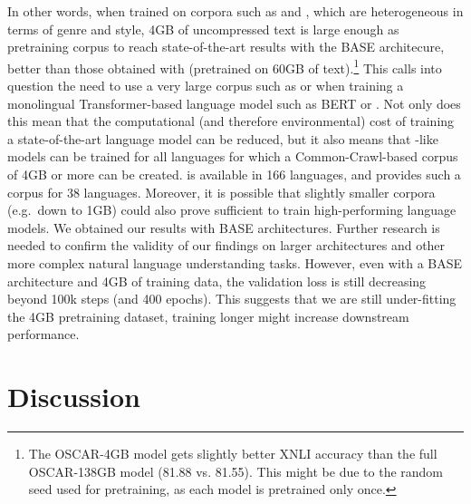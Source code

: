In other words, when trained on corpora such as \oscar and \ccnet, which are heterogeneous in terms of genre and style, 4GB of uncompressed text is large enough as pretraining corpus to reach state-of-the-art results with the BASE architecure, better than those obtained with \mbert (pretrained on 60GB of text).\footnote{The OSCAR-4GB model gets slightly better XNLI accuracy than the full OSCAR-138GB model (81.88 vs. 81.55). This might be due to the random seed used for pretraining, as each model is pretrained only once.} This calls into question the need to use a very large corpus such as \oscar or \ccnet when training a monolingual Transformer-based language model such as BERT or \roberta.
Not only does this mean that the computational (and therefore environmental) cost of training a state-of-the-art language model can be reduced, but it also means that \camembert-like models can be trained for all languages for which a Common-Crawl-based corpus of 4GB or more can be created. \oscar is available in 166 languages, and provides such a corpus for 38 languages. Moreover, it is possible that slightly smaller corpora (e.g.~down to 1GB) could also prove sufficient to train high-performing language models.
We obtained our results with BASE architectures. Further research is needed to confirm the validity of our findings on larger architectures and other more complex natural language understanding tasks.
However, even with a BASE architecture and 4GB of training data, the validation loss is still decreasing beyond 100k steps (and 400 epochs). This suggests that we are still under-fitting the 4GB pretraining dataset, training longer might increase downstream performance.

\section{Discussion}

